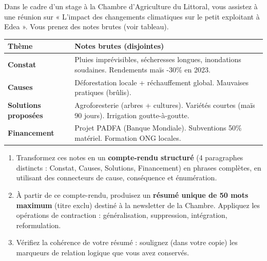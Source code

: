 \documentclass[11pt]{article}
\begin{document}
\begin{exercice}
Dans le cadre d'un stage à la Chambre d'Agriculture du Littoral, vous assistez à une réunion sur « L'impact des changements climatiques sur le petit exploitant à Edea ». Vous prenez des notes brutes (voir tableau).

\begin{tabularx}{\linewidth}{>{\bfseries}l X}
\textbf{Thème} & \textbf{Notes brutes (disjointes)} \\
\hline
Constat & Pluies imprévisibles, sécheresses longues, inondations soudaines. Rendements maïs -30\% en 2023. \\
Causes & Déforestation locale + réchauffement global. Mauvaises pratiques (brûlis). \\
Solutions proposées & Agroforesterie (arbres + cultures). Variétés courtes (maïs 90 jours). Irrigation goutte-à-goutte. \\
Financement & Projet PADFA (Banque Mondiale). Subventions 50\% matériel. Formation ONG locales. \\
\end{tabularx}

\begin{enumerate}
    \item Transformez ces notes en un \textbf{compte-rendu structuré} (4 paragraphes distincts : Constat, Causes, Solutions, Financement) en phrases complètes, en utilisant des connecteurs de cause, conséquence et énumération.
    \item À partir de ce compte-rendu, produisez un \textbf{résumé unique de 50 mots maximum} (titre exclu) destiné à la newsletter de la Chambre. Appliquez les opérations de contraction : généralisation, suppression, intégration, reformulation.
    \item Vérifiez la cohérence de votre résumé : soulignez (dans votre copie) les marqueurs de relation logique que vous avez conservés.
\end{enumerate}
\end{exercice}
\end{document}
